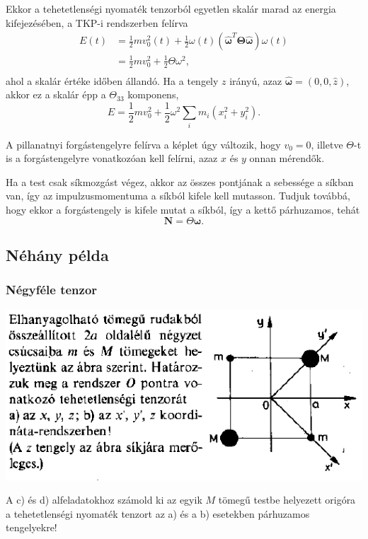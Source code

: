 \documentclass[12pt,a4paper]{scrartcl}
\let\mathbf\bm
\begin{document}
Ekkor a tehetetlenségi nyomaték tenzorból egyetlen skalár marad az energia kifejezésében, a TKP-i rendszerben felírva
\[\begin{aligned}
  E\left( t \right) &  = \frac{1}{2}mv_0^2\left( t \right) + \frac{1}{2}\omega \left( t \right)\left( {{{{\mathbf{\hat \omega }}}^T}{\mathbf{\Theta \hat \omega }}} \right)\omega \left( t \right) \\ 
   &  = \frac{1}{2}mv_0^2 + \frac{1}{2}\Theta {\omega ^2}, \\ 
\end{aligned} \]
ahol a skalár értéke időben állandó. Ha a tengely $z$ irányú, azaz ${\mathbf{\hat \omega }} = \left( {0,0,\hat z} \right)$, akkor ez a skalár épp a ${\Theta _{33}}$ komponens, 
\[E = \frac{1}{2}mv_0^2 + \frac{1}{2}{\omega ^2}\sum\limits_i {{m_i}\left( {x_i^2 + y_i^2} \right)}.\]

A pillanatnyi forgástengelyre felírva a képlet úgy változik, hogy $v_0=0$, illetve $\Theta$-t is a forgástengelyre vonatkozóan kell felírni, azaz $x$ és $y$ onnan mérendők.

Ha a test csak síkmozgást végez, akkor az összes pontjának a sebessége a síkban van, így az impulzusmomentuma a síkból kifele kell mutasson. Tudjuk továbbá, hogy ekkor a forgástengely is kifele mutat a síkból, így a kettő párhuzamos, tehát
\[{\mathbf{N}} = \Theta {\mathbf{\omega }}.\]

\subsection{Néhány példa}
\subsubsection{Négyféle tenzor}
\includegraphics[scale=0.8]{lusta/merev_test1pelda.png}

A c) és d) alfeladatokhoz számold ki az egyik $M$ tömegű testbe helyezett origóra a tehetetlenségi nyomaték tenzort az a) és a b) esetekben párhuzamos tengelyekre!
\end{document}

